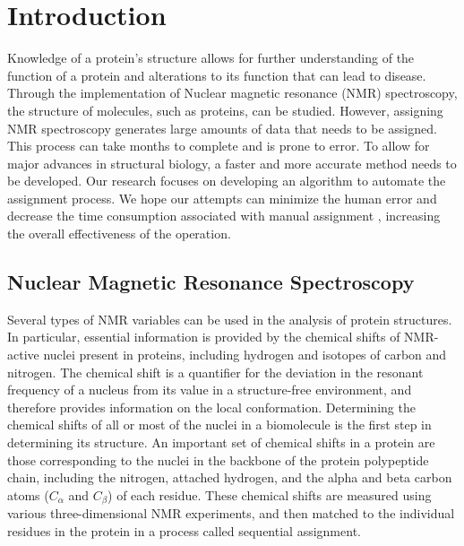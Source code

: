 \documentclass[12pt, letter]{article}
\begin{document}
\section{Introduction}
\label{sub:introduction}
Knowledge of a protein’s structure allows for further understanding of the function of a protein and alterations to its function that can lead to disease. Through the implementation of Nuclear magnetic resonance (NMR) spectroscopy, the structure of molecules, such as proteins, can be studied. However, assigning NMR spectroscopy generates large amounts of data that needs to be assigned. This process can take months to complete and is prone to error. To allow for major advances in structural biology, a faster and more accurate method needs to be developed. Our research focuses on developing an algorithm to automate the assignment process. We hope our attempts can minimize the human error and decrease the time consumption associated with manual assignment , increasing the overall effectiveness of the operation.

\subsection{Nuclear Magnetic Resonance Spectroscopy} %
\label{sub:nmr}
Several types of NMR variables can be used in the analysis of protein structures. In particular, essential information is provided by the chemical shifts of NMR-active nuclei present in proteins, including hydrogen and isotopes of carbon and nitrogen. The chemical shift is a quantifier for the deviation in the resonant frequency of a nucleus from its value in a structure-free environment, and therefore provides information on the local conformation. Determining the chemical shifts of all or most of the nuclei in a biomolecule is the first step in determining its structure. An important set of chemical shifts in a protein are those corresponding to the nuclei in the backbone of the protein polypeptide chain, including the nitrogen, attached hydrogen, and the alpha and beta carbon atoms ($C_\alpha$ and $C_{\beta}$) of each residue. These chemical shifts are measured using various three-dimensional NMR experiments, and then matched to the individual residues in the protein in a process called sequential assignment.
\end{document}
